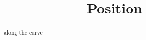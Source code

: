 \documentclass{ximera}
\title{Position}
\begin{document}
\begin{abstract}
along the curve
\end{abstract}
\maketitle
\end{document}

